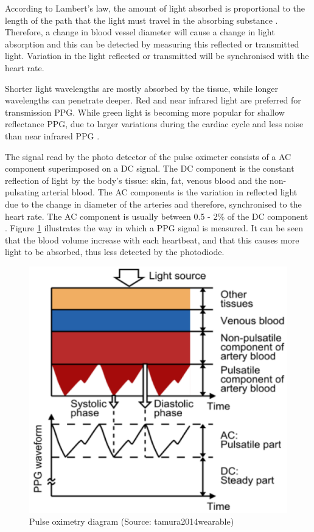 \medskip

According to Lambert's law, the amount of light absorbed is proportional to the length of the path that the light must travel in the absorbing substance \citep{lambertANDbeer}. Therefore, a change in blood vessel diameter will cause a change in light absorption and this can be detected by measuring this reflected or transmitted light. Variation in the light reflected or transmitted will be synchronised with the heart rate.

\medskip

Shorter light wavelengths are mostly absorbed by the tissue, while longer wavelengths can penetrate deeper. Red and near infrared light are preferred for transmission PPG. While green light is becoming more popular for shallow reflectance PPG, due to larger variations during the cardiac cycle and less noise than near infrared PPG \citep{tamura2014wearable}.

\medskip

The signal read by the photo detector of the pulse oximeter consists of a AC component superimposed on a DC signal. The DC component is the constant reflection of light by the body's tissue: skin, fat, venous blood and the non-pulsating arterial blood. The AC components is the variation in reflected light due to the change in diameter of the arteries and therefore, synchronised to the heart rate. The AC component is usually between 0.5 - 2\% of the DC component \citep{tavakoli2006analog}. Figure \ref{fig:PPG} illustrates the way in which a PPG signal is measured. It can be seen that the blood volume increase with each heartbeat, and that this causes more light to be absorbed, thus less detected by the photodiode.

\medskip

\begin{figure}[h]
   \centering
   \includegraphics[scale=1.2]{figs/PPG}
   \caption{Pulse oximetry diagram (Source: tamura2014wearable)}
   \label{fig:PPG}
\end{figure}

